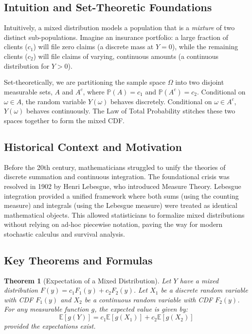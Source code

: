 \documentclass[11pt, a4paper]{article}
\newtheorem{theorem}{Theorem}[section]
\theoremstyle{definition}
\theoremstyle{remark}
\newcommand{\E}{\mathbb{E}}
\newcommand{\Prob}{\mathbb{P}}
\begin{document}
\subsection{Intuition and Set-Theoretic Foundations}
Intuitively, a mixed distribution models a population that is a \textit{mixture} of two distinct sub-populations. Imagine an insurance portfolio: a large fraction of clients ($c_1$) will file zero claims (a discrete mass at $Y = 0$), while the remaining clients ($c_2$) will file claims of varying, continuous amounts (a continuous distribution for $Y > 0$). 

Set-theoretically, we are partitioning the sample space $\Omega$ into two disjoint measurable sets, $A$ and $A^c$, where $\Prob(A) = c_1$ and $\Prob(A^c) = c_2$. Conditional on $\omega \in A$, the random variable $Y(\omega)$ behaves discretely. Conditional on $\omega \in A^c$, $Y(\omega)$ behaves continuously. The Law of Total Probability stitches these two spaces together to form the mixed CDF.

\subsection{Historical Context and Motivation}
Before the 20th century, mathematicians struggled to unify the theories of discrete summation and continuous integration. The foundational crisis was resolved in 1902 by Henri Lebesgue, who introduced Measure Theory. Lebesgue integration provided a unified framework where both sums (using the counting measure) and integrals (using the Lebesgue measure) were treated as identical mathematical objects. This allowed statisticians to formalize mixed distributions without relying on ad-hoc piecewise notation, paving the way for modern stochastic calculus and survival analysis.

\subsection{Key Theorems and Formulas}
\begin{theorem}[Expectation of a Mixed Distribution]
Let $Y$ have a mixed distribution $F(y) = c_1 F_1(y) + c_2 F_2(y)$. Let $X_1$ be a discrete random variable with CDF $F_1(y)$ and $X_2$ be a continuous random variable with CDF $F_2(y)$. For any measurable function $g$, the expected value is given by:
\[ \E[g(Y)] = c_1 \E[g(X_1)] + c_2 \E[g(X_2)] \]
provided the expectations exist.
\end{theorem}
\end{document}
